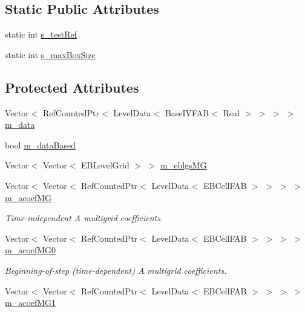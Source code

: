 \subsection*{Static Public Attributes}
\begin{DoxyCompactItemize}
\item 
static int \hyperlink{classebconductivityopfactory_a2134292a04afa30addd39cc3d6de32dd}{s\+\_\+test\+Ref}
\item 
static int \hyperlink{classebconductivityopfactory_ae6d0a228afd27b407c42efa67044dd6b}{s\+\_\+max\+Box\+Size}
\end{DoxyCompactItemize}
\subsection*{Protected Attributes}
\begin{DoxyCompactItemize}
\item 
Vector$<$ Ref\+Counted\+Ptr$<$ Level\+Data$<$ Base\+I\+V\+F\+AB$<$ Real $>$ $>$ $>$ $>$ \hyperlink{classebconductivityopfactory_a0df40ee7927f95bc042ecf2b52308322}{m\+\_\+data}
\item 
bool \hyperlink{classebconductivityopfactory_a68181d10f867f265218ab116beecae62}{m\+\_\+data\+Based}
\item 
Vector$<$ Vector$<$ E\+B\+Level\+Grid $>$ $>$ \hyperlink{classebconductivityopfactory_afbf167416b0176ba62a44cd422bd6091}{m\+\_\+eblgs\+MG}
\item 
Vector$<$ Vector$<$ Ref\+Counted\+Ptr$<$ Level\+Data$<$ E\+B\+Cell\+F\+AB $>$ $>$ $>$ $>$ \hyperlink{classebconductivityopfactory_a1e52dfc92627a55ce1545f8c102f5934}{m\+\_\+acoef\+MG}
\begin{DoxyCompactList}\small\item\em Time-\/independent A multigrid coefficients. \end{DoxyCompactList}\item 
Vector$<$ Vector$<$ Ref\+Counted\+Ptr$<$ Level\+Data$<$ E\+B\+Cell\+F\+AB $>$ $>$ $>$ $>$ \hyperlink{classebconductivityopfactory_ad70974a6e0452217180c0e48ef5a0e00}{m\+\_\+acoef\+M\+G0}
\begin{DoxyCompactList}\small\item\em Beginning-\/of-\/step (time-\/dependent) A multigrid coefficients. \end{DoxyCompactList}\item 
Vector$<$ Vector$<$ Ref\+Counted\+Ptr$<$ Level\+Data$<$ E\+B\+Cell\+F\+AB $>$ $>$ $>$ $>$ \hyperlink{classebconductivityopfactory_a6dad0d6e61b5543b7a74ea161ca921c6}{m\+\_\+acoef\+M\+G1}

\end{DoxyCompactItemize}
